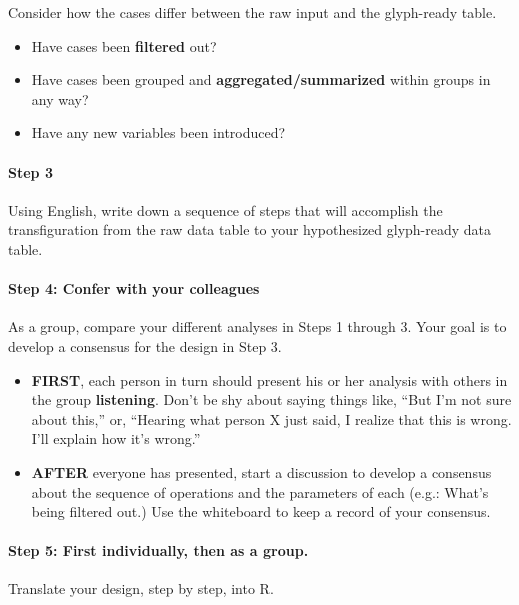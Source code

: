 \documentclass[]{article}
\begin{document}
\begin{multicols}{2}
Consider how the cases differ between the raw input and the glyph-ready
table.

\begin{itemize}
\itemsep1pt\parskip0pt
\item
  Have cases been \textbf{filtered} out?
\item
  Have cases been grouped and \textbf{aggregated/summarized} within
  groups in any way?
\item
  Have any new variables been introduced?
\end{itemize}

\paragraph{Step 3}\label{step-3}

Using English, write down a sequence of steps that will accomplish the
transfiguration from the raw data table to your hypothesized glyph-ready
data table.

\paragraph{Step 4: Confer with your
colleagues}\label{step-4-confer-with-your-colleagues}

As a group, compare your different analyses in Steps 1 through 3. Your
goal is to develop a consensus for the design in Step 3.

\begin{itemize}
\item
  \textbf{FIRST}, each person in turn should present his or her analysis
  with others in the group \textbf{listening}. Don't be shy about saying
  things like, ``But I'm not sure about this,'' or, ``Hearing what
  person X just said, I realize that this is wrong. I'll explain how
  it's wrong.''
\item
  \textbf{AFTER} everyone has presented, start a discussion to develop a
  consensus about the sequence of operations and the parameters of each
  (e.g.: What's being filtered out.) Use the whiteboard to keep a record
  of your consensus.
\end{itemize}

\paragraph{Step 5: First individually, then as a
group.}\label{step-5-first-individually-then-as-a-group.}

Translate your design, step by step, into R.


\end{multicols}
\end{document}
